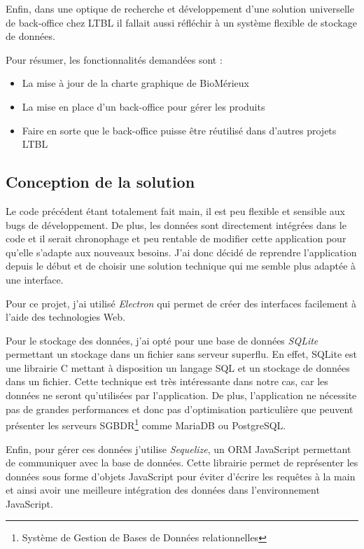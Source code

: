 Enfin, dans une optique de recherche et développement d'une solution universelle de back-office chez LTBL il fallait aussi réfléchir à un système flexible de stockage de données.

Pour résumer, les fonctionnalités demandées sont :

\begin{itemize}
    \item La mise à jour de la charte graphique de BioMérieux
    \item La mise en place d'un back-office pour gérer les produits
    \item Faire en sorte que le back-office puisse être réutilisé dans d'autres projets LTBL
\end{itemize}


\subsection{Conception de la solution}

Le code précédent étant totalement fait main, il est peu flexible et sensible aux bugs de développement.
De plus, les données sont directement intégrées dans le code et il serait chronophage et peu rentable de modifier cette application pour qu'elle s'adapte aux nouveaux besoins.
J'ai donc décidé de reprendre l'application depuis le début et de choisir une solution technique qui me semble plus adaptée à une interface.

Pour ce projet, j'ai utilisé \emph{Electron} qui permet de créer des interfaces facilement à l'aide des technologies Web.

Pour le stockage des données, j'ai opté pour une base de données \emph{SQLite} permettant un stockage dans un fichier sans serveur superflu.
En effet, SQLite est une librairie C mettant à disposition un langage SQL et un stockage de données dans un fichier.
Cette technique est très intéressante dans notre cas, car les données ne seront qu'utilisées par l'application.
De plus, l'application ne nécessite pas de grandes performances et donc pas d'optimisation particulière que peuvent présenter les serveurs SGBDR\footnote{Système de Gestion de Bases de Données relationnelles} comme MariaDB ou PostgreSQL\@.

Enfin, pour gérer ces données j'utilise \emph{Sequelize}, un ORM JavaScript permettant de communiquer avec la base de données.
Cette librairie permet de représenter les données sous forme d'objets JavaScript pour éviter d'écrire les requêtes à la main et ainsi avoir une meilleure intégration des données dans l'environnement JavaScript.

